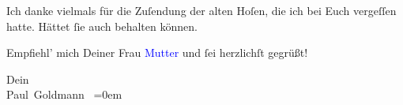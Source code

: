 \pstart
           Ich danke vielmals für die Zuſendung der alten Hoſen, die ich bei Euch vergeſſen
               hatte. Hättet ſie auch behalten können.\pend
           
\pstart
           Empfiehl’ mich Deiner Frau \textcolor{blue}{Mutter}{}\ledrightnote{{$\rightarrow$}\textcolor{blue}{Louise Schnitzler}} und ſei herzlichſt gegrüßt!\pend
           
\pstart
           Dein {\\[\baselineskip]}\spacefill\mbox{Paul Goldmann }\pend
           \leftskip=0em{}\endnumbering{}
\begin{anhang}
\end{anhang}
      